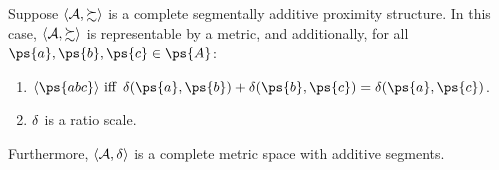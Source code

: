 
\begin{thm}\label{thm-repr-seg-add-ps} 
	Suppose $\langle \mathcal{A}, \succsim \rangle$ is a complete segmentally additive proximity structure. In this case, $\langle \mathcal{A}, \succsim \rangle$ is representable by a metric, and additionally, for all $\ps{a}, \ps{b}, \ps{c} \in \ps{A}$:
	\begin{enumerate}
		\item $\langle \ps{abc} \rangle \text{ iff } \metric(\ps{a}, \ps{b}) + \metric(\ps{b}, \ps{c}) = \metric(\ps{a}, \ps{c})$.
		\item $\operatorname{\delta}$ is a ratio scale.
	\end{enumerate}
	Furthermore, $\langle \mathcal{A}, \operatorname{\delta} \rangle$ is a complete metric space with additive segments.
\end{thm}
